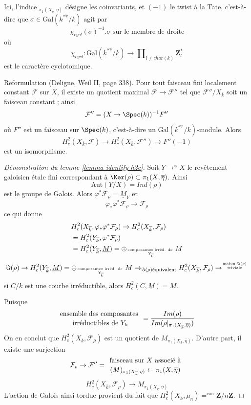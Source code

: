 \noindent
Ici, l'indice ${}_{\pi_1(X_{\overline{k}}, \overline\eta)}$
désigne les coinvariants, et $(-1)$ le twist à la Tate, c'est-à-dire que
$\sigma\in \text{Gal}(k^{^{sep}}/k)$ agit par
$$
\chi_{cycl}(\sigma)^{-1}.\sigma\text{ sur le membre de droite}
$$
où
$$
\chi_{cycl} :
\text{Gal}(k^{^{sep}}/k)
\to
\prod\nolimits_{l\neq char(k)}\mathbf{Z}_l^*
$$
est le caractère cyclotomique.

\medskip\noindent
Reformulation (Deligne, Weil II, page 338). Pour tout faisceau fini localement
constant $\mathcal{F}$ sur $X$, il existe un quotient maximal $\mathcal{F}\to
\mathcal{F}''$ tel que $\mathcal{F}''/X_{\overline{k}}$ soit un faisceau constant ; ainsi
$$
\mathcal{F}'' = (X\to \Spec(k))^{-1}F''
$$
où $F''$ est un faisceau sur $\Spec(k)$, c'est-à-dire un
$\text{Gal}(k^{^{sep}}/k)$-module. Alors
$$
H_c^2(X_{\overline{k}}, \mathcal{F})\to H_c^2(X_{\overline{k}},
\mathcal{F}'')\to F''(-1)
$$
est un isomorphisme.

\begin{proof}[Démonstration du lemme \ref{lemma-identify-h2c}]
Soit $Y\to^{\varphi}X$ le revêtement galoisien étale fini
correspondant à $\Ker(\rho) \subset \pi_1(X, \overline\eta)$. Ainsi
$$
\text{Aut}(Y/X)=Ind(\rho)
$$
est le groupe de Galois. Alors $\varphi^*\mathcal{F}_\rho =\underline M_Y$ et
$$
\varphi_*\varphi^*\mathcal{F}_\rho\to \mathcal{F}_\rho
$$
ce qui donne
\begin{align*}
& H_c^2(X_{\overline{k}}, \varphi_*\varphi^*\mathcal{F}_\rho) \to
H_c^2(X_{\overline{k}}, \mathcal{F}_\rho)\\
& =H_c^2(Y_{\overline{k}}, \varphi^*\mathcal{F}_\rho)\\
& =H_c^2(Y_{\overline{k}}, \underline M) = \oplus_{\text{composantes irréd.
de } \atop Y_{\overline{k}}}M
\end{align*}
$$
\Im(\rho) \to H_c^2(Y_{\overline{k}}, \underline M) =
\oplus_{\text{composantes irréd. de } \atop Y_{\overline{k}}}
M \to_{\Im(\rho) \text{équivalent}} H_c^2(X_{\overline{k}},
\mathcal{F}_{\rho}) \to^{\text{action }
\Im(\rho) \atop \text{triviale}}
$$
si $C/\overline{k}$ est une courbe irréductible, alors $H_c^2(C, \underline M)=M$.

\medskip\noindent
Puisque
$$
{\text{ensemble des composantes } \atop \text{irréductibles de }Y_k} =
\frac{Im(\rho)}{Im(\rho|_{\pi_1(X_{\overline{k}}, \overline \eta)})}
$$
On en conclut que $H_c^2(X_{\overline{k}}, \mathcal{F}_\rho)$ est un
quotient de $M_{\pi_1(X_{\overline{k}}, \overline \eta)}$. D'autre part,
il existe une surjection
$$
\mathcal{F}_\rho\to \mathcal{F}'' = {\text{ faisceau sur }
X\text{ associé à } \atop (M)_{\pi_1(X_{\overline{k}}, \overline
\eta)}\leftarrow\pi_1(X, \overline \eta)}
$$
$$
H_c^2(X_{\overline{k}}, \mathcal{F}_\rho)\to
M_{\pi_1(X_{\overline{k}}, \overline\eta)}
$$
L'action de Galois ainsi tordue provient du fait que
$H_c^2(X_{\overline{k}}, \mu_n)=^{\text{can}} \mathbf{Z}/n\mathbf{Z}$.
\end{proof}

